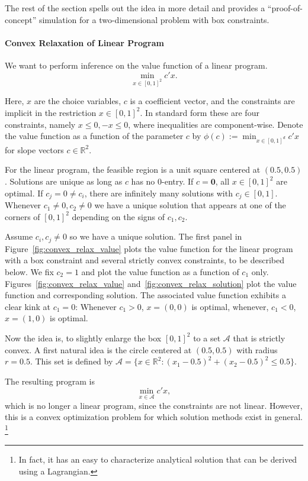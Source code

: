 \documentclass[12pt,a4paper,english]{article} %
\numberwithin{equation}{section}
\theoremstyle{definition}
\theoremstyle{remark}
\theoremstyle{plain}
\begin{document}
The rest of the section spells out the idea in more detail and provides a ``proof-of-concept'' simulation for a two-dimensional problem with box constraints.

\paragraph{Convex Relaxation of Linear Program}
We want to perform inference on the value function of a linear program.
\begin{equation}
	\min_{x\in [0,1]^2} c'x.
\end{equation}

Here, $x$ are the choice variables, $c$ is a coefficient vector, and the constraints are implicit in the restriction $x \in [0,1]^2$.
In standard form these are four constraints, namely $x \leq 0, -x \leq 0$, where inequalities are component-wise.
Denote the value function as a function of the parameter $c$ by $\phi(c) := \min_{x\in[0,1]^d} c'x$ for slope vectors $c\in \mathbb{R}^2$.

For the linear program, the feasible region is a unit square centered at $(0.5, 0.5)$. Solutions are unique as long as $c$ has no $0$-entry.
If $c=\mathbf{0}$, all $x\in [0,1]^2$ are optimal. If $c_j = 0 \neq c_i$, there are infinitely many solutions with $c_j \in [0,1]$.
Whenever $c_1\neq0, c_2\neq0$ we have a unique solution that appears at one of the corners of $[0,1]^2$ depending on the signs of $c_1, c_2$.

Assume $c_i, c_j \neq 0$ so we have a unique solution.
The first panel in Figure~\ref{fig:convex_relax_value} plots the value function for the linear program with a box constraint and several strictly convex constraints, to be described below.
We fix $c_2 = 1$ and plot the value function as a function of $c_1$ only.
Figures~\ref{fig:convex_relax_value} and~\ref{fig:convex_relax_solution} plot the value function and corresponding solution.
The associated value function exhibits a clear kink at $c_1 = 0$: Whenever $c_1 > 0$, $x = (0, 0)$ is optimal, whenever, $c_1 < 0$, $x=(1,0)$ is optimal.

Now the idea is, to slightly enlarge the box $[0,1]^2$ to a set $\mathcal{A}$ that is strictly convex.
A first natural idea is the circle centered at $(0.5, 0.5)$ with radius $r=0.5$.
This set is defined by $\mathcal{A} = \{x \in \mathbb{R}^2: (x_1 - 0.5)^2 + (x_2 - 0.5)^2 \leq 0.5\}$.

The resulting program is
\begin{equation}
	\min_{x\in\mathcal{A}} c'x,
\end{equation}
which is no longer a linear program, since the constraints are not linear.
However, this is a convex optimization problem for which solution methods exist in general.
\footnote{In fact, it has an easy to characterize analytical solution that can be derived using a Lagrangian.}
\end{document}
